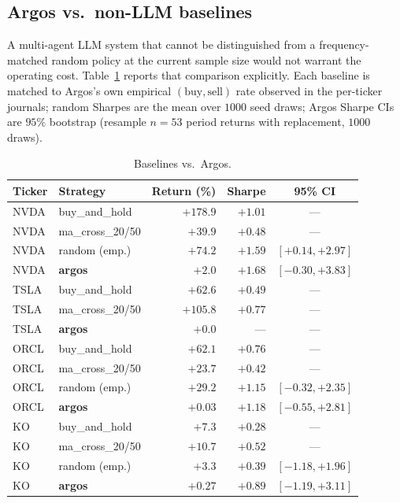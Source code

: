 \documentclass[conference]{IEEEtran}
\begin{document}
\subsection{Argos vs.\ non-LLM baselines}
\label{sec:results-baselines}

A multi-agent LLM system that cannot be distinguished from a
frequency-matched random policy at the current sample size would
not warrant the operating cost. Table~\ref{tab:baselines} reports
that comparison explicitly. Each baseline is matched to Argos's own
empirical $(\mathrm{buy},\mathrm{sell})$ rate observed in the
per-ticker journals; random Sharpes are the mean over $1000$ seed
draws; Argos Sharpe CIs are $95\%$ bootstrap (resample $n{=}53$
period returns with replacement, $1000$ draws).

\begin{table}[t]
\caption{Baselines vs.\ Argos.}
\label{tab:baselines}
\centering\scriptsize
\begin{tabular}{llrrc}
\toprule
Ticker & Strategy & Return (\%) & Sharpe & 95\% CI \\
\midrule
NVDA & buy\_and\_hold         & $+178.9$ & $+1.01$ & --- \\
NVDA & ma\_cross\_20/50       & $+39.9$  & $+0.48$ & --- \\
NVDA & random (emp.)          & $+74.2$  & $+1.59$ & $[+0.14,+2.97]$ \\
NVDA & \textbf{argos}         & $+2.0$   & $\mathbf{+1.68}$ & $[-0.30,+3.83]$ \\
\midrule
TSLA & buy\_and\_hold         & $+62.6$  & $+0.49$ & --- \\
TSLA & ma\_cross\_20/50       & $+105.8$ & $+0.77$ & --- \\
TSLA & \textbf{argos}         & $+0.0$   & ---     & --- \\
\midrule
ORCL & buy\_and\_hold         & $+62.1$  & $+0.76$ & --- \\
ORCL & ma\_cross\_20/50       & $+23.7$  & $+0.42$ & --- \\
ORCL & random (emp.)          & $+29.2$  & $+1.15$ & $[-0.32,+2.35]$ \\
ORCL & \textbf{argos}         & $+0.03$  & $\mathbf{+1.18}$ & $[-0.55,+2.81]$ \\
\midrule
KO   & buy\_and\_hold         & $+7.3$   & $+0.28$ & --- \\
KO   & ma\_cross\_20/50       & $+10.7$  & $+0.52$ & --- \\
KO   & random (emp.)          & $+3.3$   & $+0.39$ & $[-1.18,+1.96]$ \\
KO   & \textbf{argos}         & $+0.27$  & $\mathbf{+0.89}$ & $[-1.19,+3.11]$ \\
\bottomrule
\end{tabular}
\end{table}
\end{document}
